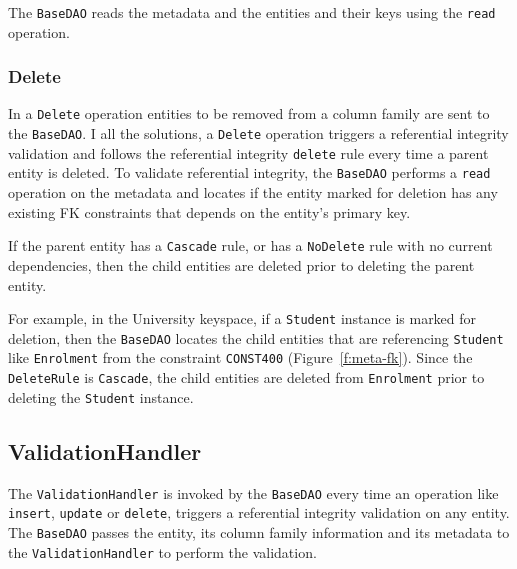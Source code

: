 		The \texttt{BaseDAO} reads the metadata and the entities and their keys using
		the \texttt{read} operation. 
		
		\subsubsection{Delete}
		In a  \texttt{Delete} operation entities to be removed from a column
		family are sent to the \texttt{BaseDAO}. 
		I all the solutions, a \texttt{Delete} operation triggers a referential
		integrity validation and follows the referential integrity \texttt{delete}
		rule every time a parent entity is deleted.  To validate referential integrity,
		the \texttt{BaseDAO} performs a \texttt{read} operation on the metadata and 
		locates if the entity
		marked for deletion has any existing \ac{FK} constraints that depends on the
		entity's primary key. 
		
		If the parent  entity has a \texttt{Cascade} rule, or has a
		\texttt{NoDelete} rule with no current dependencies, then the child entities
		are deleted prior to deleting the parent entity. 
		
		For example, in the University keyspace, if a 
		\texttt{Student} instance is marked for deletion, then the \texttt{BaseDAO}
		locates the child entities that are referencing \texttt{Student} like
		\texttt{Enrolment} from the constraint \texttt{CONST400}
		(Figure~\ref{f:meta-fk}).  Since the \texttt{DeleteRule} is \texttt{Cascade},
		the child entities are deleted from \texttt{Enrolment} prior to deleting the
		\texttt{Student} instance. 
		
		\subsection{ValidationHandler}
		The \texttt{ValidationHandler} is invoked by the \texttt{BaseDAO} every time
		an operation like \texttt{insert}, \texttt{update} or \texttt{delete}, triggers a
		referential integrity validation on any entity. 
		The \texttt{BaseDAO} passes the entity, its
		column family information and its metadata  to the
		\texttt{ValidationHandler} to perform the validation.  
		

